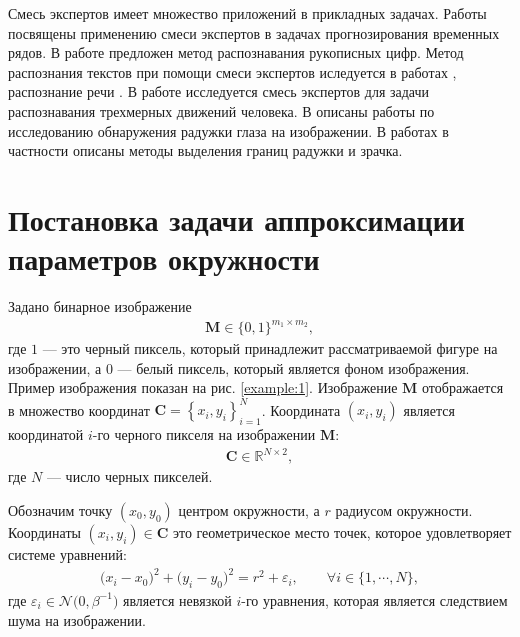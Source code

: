 Смесь экспертов имеет множество приложений в прикладных задачах. Работы \cite{Yumlu2003, Cheung1995, Weigend2000} посвящены применению смеси экспертов в задачах прогнозирования временных рядов. 
В работе \cite{Ebrahimpour2009} предложен метод распознавания рукописных цифр. 
Метод распознания текстов при помощи смеси экспертов иследуется в работах \cite{Estabrooks2001}, распознание речи \cite{Mossavat2010, Peng1996, Tuerk2001}. 
В работе \cite{Sminchisescu2007} исследуется смесь экспертов для задачи распознавания трехмерных движений человека. 
В \cite{Bowyer2010} описаны работы по исследованию обнаружения радужки глаза на изображении. В работах \cite{Matveev2010, Matveev2014} в частности описаны методы выделения границ радужки и зрачка.

\section{Постановка задачи аппроксимации параметров окружности}
Задано бинарное изображение
\[
\label{eq:st:cr:1}
\begin{aligned}
\textbf{M} \in \{0,1\}^{m_1 \times m_2},
\end{aligned}
\]
где $1$ --- это черный пиксель, который принадлежит рассматриваемой фигуре на изображении, а $0$ --- белый пиксель, который является фоном изображения. 
Пример изображения показан на рис. \ref{example:1}.
Изображение $\textbf{M}$ отображается в множество координат \mbox{$\textbf{C}=\left\{x_i, y_i\right\}_{i=1}^{N}$}. Координата $(x_i, y_i)$ является координатой $i$-го черного пикселя на изображении $\textbf{M}$:
\[
\label{eq:st:cr:2}
\begin{aligned}
\textbf{C} \in  \mathbb{R}^{N \times 2},
\end{aligned}
\]
где $N$ --- число черных пикселей.

Обозначим точку $(x_0, y_0)$ центром окружности, а $r$ радиусом окружности.
Координаты $\left(x_i, y_i\right)\in\textbf{C}$ это геометрическое место точек, которое удовлетворяет системе уравнений:
\[
\label{eq:st:cr:3}
\begin{aligned}
\bigr(x_i - x_0\bigr)^{2}+\bigr(y_i-y_0\bigr)^2 = r^2 + \varepsilon_i, \qquad \forall i \in \{1, \cdots, N\},
\end{aligned}
\]
где $\varepsilon_i \in \mathcal{N}\bigr(0, \beta^{-1}\bigr)$ является невязкой $i$-го уравнения, которая является следствием шума на изображении.


